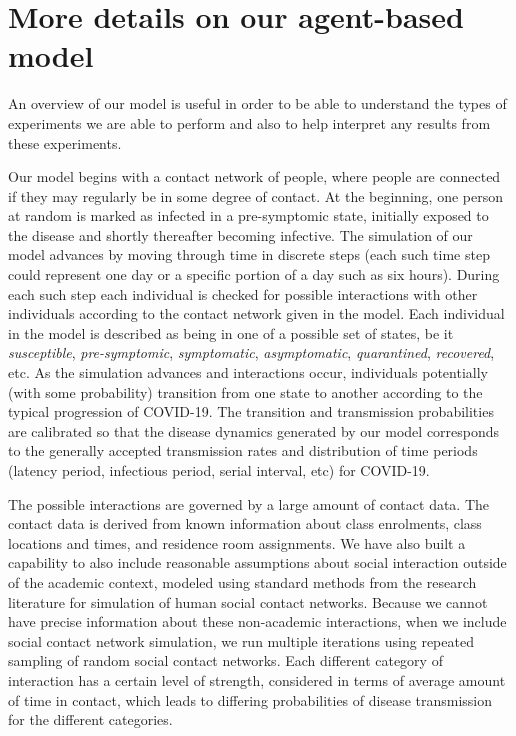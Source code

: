 \documentclass[fleqn,10pt]{SelfArx} %
\begin{document}
\section{More details on our agent-based model}
An overview of our model is useful in order to be able to understand the types of experiments we are able to perform and also to help interpret any results from these experiments.

Our model begins with a contact network of people, where people are connected if they may regularly be in some degree of contact.  At the beginning, one person at random is marked as infected in a pre-symptomic state, initially exposed to the disease and shortly thereafter becoming infective.  
The simulation of our model advances by moving through time in discrete steps (each such time step could represent one day or a specific portion of a day such as six hours).
During each such step each individual is checked for possible interactions with other individuals according to the contact network given in the model.
Each individual in the model is described as being in one of a possible set of states, be it \emph{susceptible}, \emph{pre-symptomic}, \emph{symptomatic}, \emph{asymptomatic}, \emph{quarantined}, \emph{recovered}, etc.  As the simulation advances and interactions occur, individuals potentially (with some probability) transition from one state to another according to the typical progression of COVID-19.
The transition and transmission probabilities are calibrated so that the disease dynamics generated by our model corresponds to the generally accepted transmission rates and distribution of time periods (latency period, infectious period, serial interval, etc) for COVID-19.

The possible interactions are governed by a large amount of contact data.
The contact data is derived from known information about class enrolments, class locations and times, and residence room assignments.
We have also built a capability to also include reasonable assumptions about social interaction outside of the academic context, modeled using standard methods from the research literature for simulation of human social contact networks. Because we cannot have precise information about these non-academic interactions, when we include social contact network simulation, we run multiple iterations using repeated sampling of random social contact networks.
Each different category of interaction has a certain level of strength, considered in terms of average amount of time in contact, which leads to differing probabilities of disease transmission for the different categories.
\end{document}
